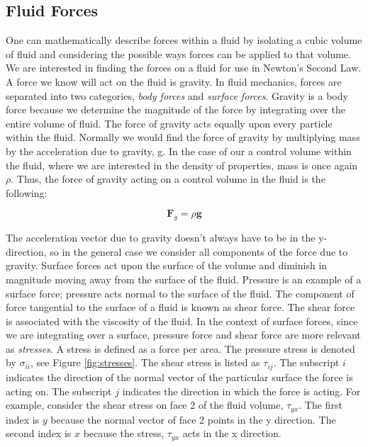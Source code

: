 \documentclass[twocolumn,12pth]{article}
\begin{document}
\subsection{Fluid Forces}

One can mathematically describe forces within a fluid by isolating a cubic volume of fluid and considering the possible ways forces can be applied to that volume. 
We are interested in finding the forces on a fluid for use in Newton's Second Law.
A force we know will act on the fluid is gravity.
In fluid mechanics, forces are separated into two categories, \textit{body forces} and \textit{surface forces}.
Gravity is a body force because we determine the magnitude of the force by integrating over the entire volume of fluid.
The force of gravity acts equally upon every particle within the fluid.
Normally we would find the force of gravity by multiplying mass by the acceleration due to gravity, g.
In the case of our a control volume within the fluid, where we are interested in the density of properties, mass is once again $\rho$.
Thus, the force of gravity acting on a control volume in the fluid is the following:

\begin{equation}
\mathbf{F}_g = \rho\mathbf{g}
\label{eq:grav}
\end{equation}

The acceleration vector due to gravity doesn't always have to be in the y-direction, so in the general case we consider all components of the force due to gravity.
Surface forces act upon the surface of the volume and diminish in magnitude moving away from the surface of the fluid.
Pressure is an example of a surface force; pressure acts normal to the surface of the fluid.
The component of force tangential to the surface of a fluid is known as shear force.
The shear force is associated with the viscosity of the fluid.
In the context of surface forces, since we are integrating over a surface, pressure force and shear force are more relevant as \textit{stresses}.
A stress is defined as a force per area.
The pressure stress is denoted by $\sigma_{ii}$, see Figure \ref{fig:stresses}.
The shear stress is listed as $\tau_{ij}$.
The subscript $i$ indicates the direction of the normal vector of the particular surface the force is acting on.
The subscript $j$ indicates the direction in which the force is acting.
For example, consider the shear stress on face 2 of the fluid volume, $\tau_{yx}$.
The first index is $y$ because the normal vector of face 2 points in the y direction.
The second index is $x$ because the stress, $\tau_{yx}$ acts in the x direction.
\end{document}
